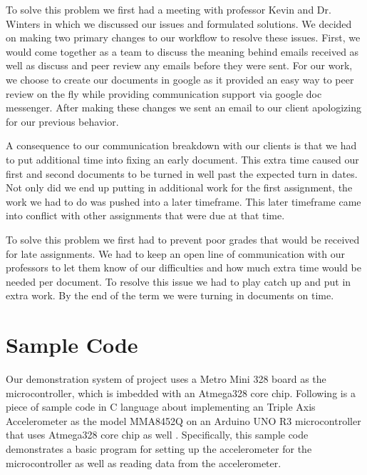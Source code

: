 \documentclass[letterpaper,10pt,onecolumn]{IEEEtran}
\begin{document}
To solve this problem we first had a meeting with professor Kevin and Dr. Winters in which we discussed our issues and formulated solutions. We decided on making two primary changes to our workflow to resolve these issues. First, we would come together as a team to discuss the meaning behind emails received as well as discuss and peer review any emails before they were sent. For our work, we choose to create our documents in google as it provided an easy way to peer review on the fly while providing communication support via google doc messenger. After making these changes we sent an email to our client apologizing for our previous behavior.

A consequence to our communication breakdown with our clients is that we had to put additional time into fixing an early document. This extra time caused our first and second documents to be turned in well past the expected turn in dates. Not only did we end up putting in additional work for the first assignment, the work we had to do was pushed into a later timeframe. This later timeframe came into conflict with other assignments that were due at that time.

To solve this problem we first had to prevent poor grades that would be received for late assignments. We had to keep an open line of communication with our professors to let them know of our difficulties and how much extra time would be needed per document. To resolve this issue we had to play catch up and put in extra work. By the end of the term we were turning in documents on time. 


\newpage
\section{Sample Code}
Our demonstration system of project uses a Metro Mini 328 board as the microcontroller, which is imbedded with an Atmega328 core chip. Following is a piece of sample code in C language about implementing an Triple Axis Accelerometer as the model MMA8452Q on an Arduino UNO R3 microcontroller that uses Atmega328 core chip as well \cite{sampleCode}. Specifically, this sample code demonstrates a basic program for setting up the accelerometer for the microcontroller as well as reading data from the accelerometer.\\
\end{document}
